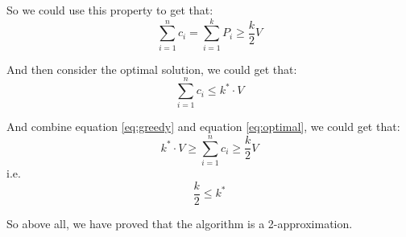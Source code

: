 So we could use this property to get that:
\begin{equation}
    \sum_{i=1}^{n}c_i=\sum_{i=1}^{k}P_i\geq \dfrac{k}{2}V
    \label{eq:greedy}
\end{equation}

And then consider the optimal solution, we could get that:
\begin{equation}
    \sum_{i=1}^{n}c_i\leq k^*\cdot V
    \label{eq:optimal}
\end{equation}

And combine equation \ref{eq:greedy} and equation \ref{eq:optimal}, we could get that:
$$k^*\cdot V \geq \sum_{i=1}^{n}c_i \geq \dfrac{k}{2}V$$
i.e.
$$\dfrac{k}{2}\leq k^*$$

So above all, we have proved that the algorithm is a 2-approximation.\\

\newpage